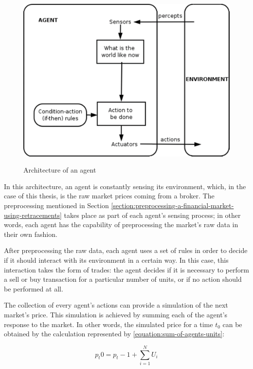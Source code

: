 \begin{figure}
\caption{Architecture of an agent} \centering
\includegraphics[width=1.0\textwidth]{img/agent-architecture.png}
\label{figure:agent-architecture}
\end{figure}

In this architecture, an agent is constantly sensing its environment, which, in
the case of this thesis, is the raw market prices coming from a broker. The
preprocessing mentioned in Section
\ref{section:preprocessing-a-financial-market-using-retracements} takes place as
part of each agent's sensing process; in other words, each agent has the
capability of preprocessing the market's raw data in their own fashion.

After preprocessing the raw data, each agent uses a set of rules in order to
decide if it should interact with its environment in a certain way. In this
case, this interaction takes the form of trades: the agent decides if it is
necessary to perform a sell or buy transaction for a particular number of units,
or if no action should be performed at all.

The collection of every agent's actions can provide a simulation of the next
market's price. This simulation is achieved by summing each of the agent's
response to the market. In other words, the simulated price for a time $t_0$ can
be obtained by the calculation represented by \ref{equation:sum-of-agents-units}:

\begin{equation}
  \label{equation:sum-of-agents-units}
  p_t0 = p_t-1 + \sum_{i=1}^{N} U_i
\end{equation}

